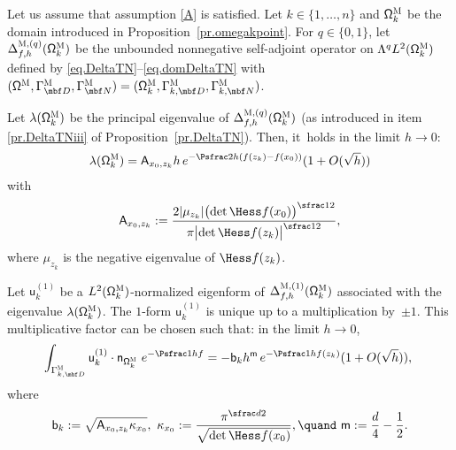 \begin{proposition}
\label{pr.VP-DeltaTN}
Let us assume that assumption \ref{A} is satisfied. Let
$k\in\{1,\ldots,n\}$ and $ \mathsf \Omega_k^{\textsc{M}} $ be the
domain introduced in Proposition~\ref{pr.omegakpoint}. For $q\in\{0,1\}$, let $\Delta_{f,h}^{\textsc{M}, (q)}(\mathsf \Omega_k^{\textsc{M}})$ be the unbounded
nonnegative self-adjoint operator on
$ \Lambda^qL^{2} (\mathsf \Omega_k^{\textsc{M}})$ defined by \eqref{eq.DeltaTN}--\eqref{eq.domDeltaTN} with $(\mathsf \Omega^{\textsc{M}}, \Gamma^{\textsc{M}}_{\mbf D}, \Gamma^{\textsc{M}}_{\mbf N}) = (\mathsf \Omega_k^{\textsc{M}}, \Gamma_{k,\mbf D}^{\textsc{M}}, \Gamma_{k,\mbf N}^{\textsc{M}})$.

Let $\lambda(\mathsf \Omega_k^{\textsc{M}})$ be the principal
eigenvalue of $\Delta_{f,h}^{\textsc{M}, (q)}(\mathsf
\Omega_k^{\textsc{M}})$ (as introduced in item \eqref{pr.DeltaTNiii} of Proposition~\ref{pr.DeltaTN}). Then, it~holds in the limit $h\to 0$:
\begin{align}
\label{eq.DL-blambda1}
\lambda(\mathsf \Omega_k^{\textsc{M}})= \mathsf A_{x_0,z_k} h \, e^{-\Psfrac 2h (f(z_k)-f(x_0))} (1+O(\sqrt h))
\end{align}
with\vspace*{-4pt}
\begin{align}
\label{eq.ax0zk}
\mathsf A_{x_0,z_k}:=\frac{ 2\vert \mu_{z_k}\vert \bigl(\det \Hess f (x_0) \bigr)^{\sfrac12} }{ \pi \bigl\vert \det \Hess f (z_k) \bigr\vert^{\sfrac12}},
\end{align}
where $\mu_{z_k}$ is the negative eigenvalue of $\Hess f (z_k)$.

Let $\mathsf u^{(1)}_k$ be a $L^2(\mathsf
\Omega_k^{\textsc{M}})$-normalized eigenform of $
\Delta_{f,h}^{\textsc{M},(1)} (\mathsf \Omega_k^{\textsc{M}}) $
associated with the eigenvalue $\lambda(\mathsf
\Omega_k^{\textsc{M}})$. The $1$-form $\mathsf u^{(1)}_k$ is unique
up to a multiplication by~$\pm 1$. This multiplicative factor can be
chosen such that: in the limit $h\to 0$,\vspace*{-3pt}
\begin{align}\label{eq.DL-boun1}
\int_{\Gamma_{k,\mbf D}^{\textsc{M}}}\mathsf u^{(1)}_k \cdot \mathsf n_{ \mathsf \Omega_k^{\textsc{M}} }\ e^{-\Psfrac 1hf}=-\mathsf b_k h^{\mathsf m} \, e^{-\Psfrac 1h f(z_k)} (1+O(\sqrt h)),\
\end{align}
where\vspace*{-4pt}
\begin{align}\label{eq.kappa_0}
\mathsf b_k:=\sqrt{\mathsf A_{x_0,z_k}\kappa_{x_0}}, \ \kappa_{x_0}:=\frac{\pi^{\sfrac d2}}{ \sqrt{\det \Hess f(x_0)}}, \quand \ \mathsf m:= {\frac d4}-\frac 12.
\end{align}
\end{proposition}

